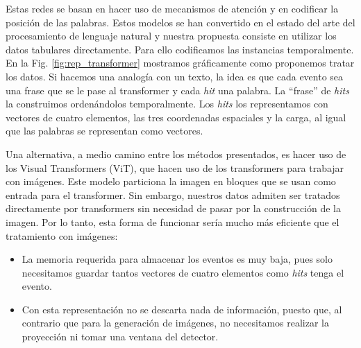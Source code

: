 \documentclass[a4paper,12pt,oneside,titlepage]{book}
\begin{document}
Estas redes se basan en hacer uso de mecanismos de atención y en codificar la posición de las palabras. Estos modelos se han convertido en el estado del arte del procesamiento de lenguaje natural y nuestra propuesta consiste en utilizar los datos tabulares directamente. Para ello codificamos las instancias temporalmente. En la Fig. \ref{fig:rep_transformer} mostramos gráficamente como proponemos tratar los datos. Si hacemos una analogía con un texto, la idea es que cada evento sea una frase que se le pase al transformer y cada \textit{hit} una palabra. La ``frase'' de \textit{hits} la construimos ordenándolos temporalmente. Los \textit{hits} los representamos con vectores de cuatro elementos, las tres coordenadas espaciales y la carga, al igual que las palabras se representan como vectores.  

Una alternativa, a medio camino entre los métodos presentados, es hacer uso de los Visual Transformers (ViT), que hacen uso de los transformers para trabajar con imágenes. Este modelo particiona la imagen en bloques que se usan como entrada para el transformer. Sin embargo, nuestros datos admiten ser tratados directamente por transformers sin necesidad de pasar por la construcción de la imagen. Por lo tanto, esta forma de funcionar sería mucho más eficiente que el tratamiento con imágenes:

\begin{itemize}
  \item La memoria requerida para almacenar los eventos es muy baja, pues solo necesitamos guardar tantos vectores de cuatro elementos como \textit{hits} tenga el evento.
  \item Con esta representación no se descarta nada de información, puesto que, al contrario que para la generación de imágenes, no necesitamos realizar la proyección ni tomar una ventana del detector.
\end{itemize}
\end{document}
